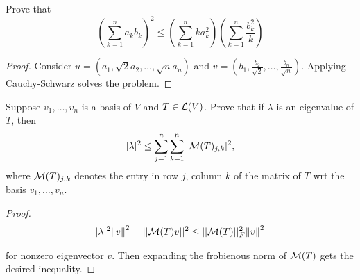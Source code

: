 \documentclass{extarticle}
\begin{document}
\begin{problem}{17}
    Prove that 
    \[(\sum_{k=1}^{n} a_k b_k)^2 \leq (\sum_{k=1}^{n} k a_k^2) (\sum_{k=1}^{n} \frac{b_k^2}{k})\]
\end{problem}

\begin{proof}
Consider \(u = (a_1, \sqrt{2}a_2, \ldots, \sqrt{n}a_n)\) and 
\(v = (b_1, \frac{b_2}{\sqrt{2}}, \ldots, \frac{b_n}{\sqrt{n}})\). Applying Cauchy-Schwarz solves the problem.
\end{proof}


        



\begin{problem}{19}
    Suppose \(v_1, \ldots, v_n\) is a basis of \(V\) and \(T \in \mathcal{L}(V)\). Prove that 
    if \(\lambda\) is an eigenvalue of \(T\), then 
    \[|\lambda|^2 \leq \sum_{j=1}^{n} \sum_{k=1}^{n} |\mathcal{M}(T)_{j,k}|^2,\]
    where \(\mathcal{M}(T)_{j,k}\) denotes the entry in row \(j\), column \(k\) of the matrix of \(T\) 
    wrt the basis \(v_1, \ldots, v_n\).
\end{problem}

\begin{proof}


\begin{align*}
    |\lambda|^2 \norm{v}^2 = || \mathcal{M}(T) v ||^2 \leq || \mathcal{M}(T) ||_F^2 \norm{v}^2 
\end{align*}

for nonzero eigenvector \(v\). Then expanding the frobienous norm of \(\mathcal{M}(T)\) gets the desired inequality.

\end{proof}
\end{document}
